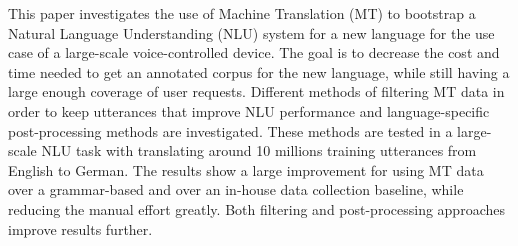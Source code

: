 This paper investigates the use of Machine Translation (MT) to bootstrap a Natural Language Understanding (NLU) system for a new language for the use case of a large-scale voice-controlled device. The goal is to decrease the cost and time needed to get an annotated corpus for the new language, while still having a large enough coverage of user requests. Different methods of filtering MT data in order to keep utterances that improve NLU performance and language-specific post-processing methods are investigated. These methods are tested in a large-scale NLU task with translating around 10 millions training utterances from English to German. The results show a large improvement for using MT data over a grammar-based and over an in-house data collection baseline, while reducing the manual effort greatly. Both filtering and post-processing approaches improve results further.
